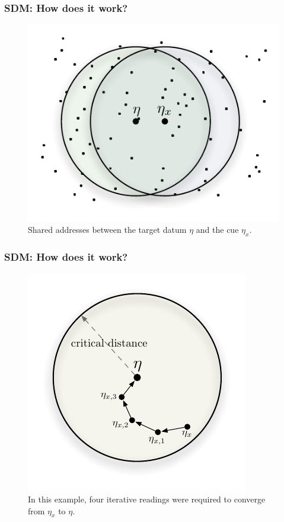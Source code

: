 \documentclass{beamer}
\begin{document}
\begin{frame}
\frametitle{SDM: How does it work?}
\begin{figure}
\centering\includegraphics[scale=0.75]{./images02/p1_inter_p2.pdf}
\caption{Shared addresses between the target datum $\eta$ and the cue $\eta_{x}$.}
\end{figure}
\end{frame}


\begin{frame}
\frametitle{SDM: How does it work?}
\begin{figure}
\centering\includegraphics[scale=0.75]{./images02/p1_p2_iter_read.pdf}
\caption{In this example, four iterative readings were required to converge from $\eta_{x}$ to $\eta$.}
\end{figure}
\end{frame}
\end{document}

